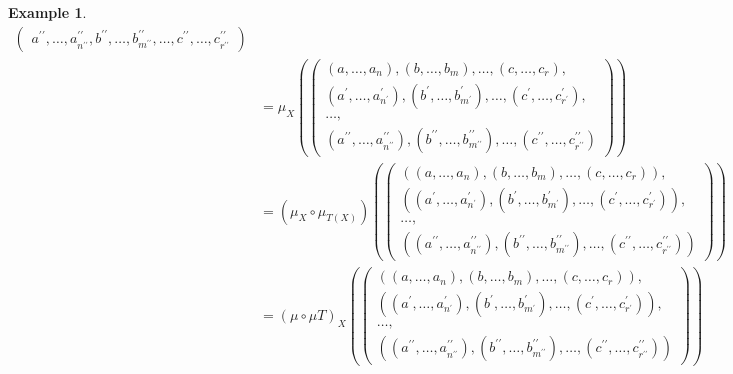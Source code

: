 \documentclass[11pt,a4paper]{article}
\theoremstyle{definition}
\newtheorem{example}[thm]{Example}
\numberwithin{equation}{section}
\begin{document}
\begin{example}
\begin{align*}
\begin{pmatrix}
        a^{\prime\prime},\dots, a^{\prime\prime}_{n^{\prime\prime}},b^{\prime\prime},\dots ,b^{\prime\prime}_{m^{\prime\prime}},\dots,c^{\prime\prime},\dots, c^{\prime\prime}_{r^{\prime\prime}}
    \end{pmatrix} \\
    &= \mu_X(\begin{pmatrix}
        (a,\dots, a_n),(b,\dots ,b_m),\dots,(c,\dots, c_r), \\
        (a^\prime,\dots, a^\prime_{n^\prime}),(b^\prime,\dots, b^\prime_{m^\prime}),\dots,(c^\prime,\dots, c^\prime_{r^\prime}), \\
        \dots, \\
        (a^{\prime\prime},\dots, a^{\prime\prime}_{n^{\prime\prime}}),(b^{\prime\prime},\dots ,b^{\prime\prime}_{m^{\prime\prime}}),\dots,(c^{\prime\prime},\dots, c^{\prime\prime}_{r^{\prime\prime}})
    \end{pmatrix})\\
    &= (\mu_X \circ \mu_{T(X)})(\begin{pmatrix}
        ((a,\dots, a_n),(b,\dots ,b_m),\dots,(c,\dots, c_r)), \\
        ((a^\prime,\dots, a^\prime_{n^\prime}),(b^\prime,\dots, b^\prime_{m^\prime}),\dots,(c^\prime,\dots, c^\prime_{r^\prime})), \\
        \dots, \\
        ((a^{\prime\prime},\dots, a^{\prime\prime}_{n^{\prime\prime}}),(b^{\prime\prime},\dots ,b^{\prime\prime}_{m^{\prime\prime}}),\dots,(c^{\prime\prime},\dots, c^{\prime\prime}_{r^{\prime\prime}}))
    \end{pmatrix})\\
        &= (\mu \circ \mu T)_{X}(\begin{pmatrix}
        ((a,\dots, a_n),(b,\dots ,b_m),\dots,(c,\dots, c_r)), \\
        ((a^\prime,\dots, a^\prime_{n^\prime}),(b^\prime,\dots, b^\prime_{m^\prime}),\dots,(c^\prime,\dots, c^\prime_{r^\prime})), \\
        \dots, \\
        ((a^{\prime\prime},\dots, a^{\prime\prime}_{n^{\prime\prime}}),(b^{\prime\prime},\dots ,b^{\prime\prime}_{m^{\prime\prime}}),\dots,(c^{\prime\prime},\dots, c^{\prime\prime}_{r^{\prime\prime}}))
    \end{pmatrix})
    \end{align*}


\end{example}
\end{document}
